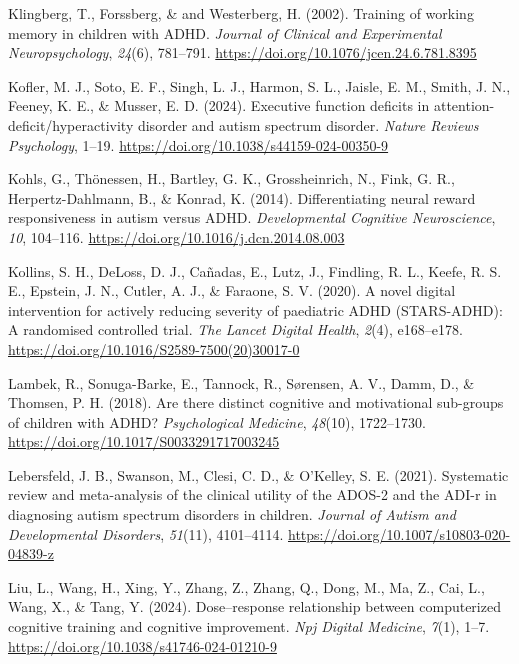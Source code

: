 \documentclass[
  letterpaper,
]{ut-thesis}
\newlength{\cslhangindent}
\newenvironment{CSLReferences}[2] %
 {\begin{list}{}{%
  \setlength{\itemindent}{0pt}
  \setlength{\leftmargin}{0pt}
  \setlength{\parsep}{0pt}
  \ifodd #1
   \setlength{\leftmargin}{\cslhangindent}
   \setlength{\itemindent}{-1\cslhangindent}
  \fi
  \setlength{\itemsep}{#2\baselineskip}}}
 {\end{list}}
\begin{document}
\begin{CSLReferences}{1}{0}
Klingberg, T., Forssberg, \& and Westerberg, H. (2002). Training of
working memory in children with {ADHD}. \emph{Journal of Clinical and
Experimental Neuropsychology}, \emph{24}(6), 781--791.
\url{https://doi.org/10.1076/jcen.24.6.781.8395}

Kofler, M. J., Soto, E. F., Singh, L. J., Harmon, S. L., Jaisle, E. M.,
Smith, J. N., Feeney, K. E., \& Musser, E. D. (2024). Executive function
deficits in attention-deficit/hyperactivity disorder and autism spectrum
disorder. \emph{Nature Reviews Psychology}, 1--19.
\url{https://doi.org/10.1038/s44159-024-00350-9}

Kohls, G., Thönessen, H., Bartley, G. K., Grossheinrich, N., Fink, G.
R., Herpertz-Dahlmann, B., \& Konrad, K. (2014). Differentiating neural
reward responsiveness in autism versus {ADHD}. \emph{Developmental
Cognitive Neuroscience}, \emph{10}, 104--116.
\url{https://doi.org/10.1016/j.dcn.2014.08.003}

Kollins, S. H., DeLoss, D. J., Cañadas, E., Lutz, J., Findling, R. L.,
Keefe, R. S. E., Epstein, J. N., Cutler, A. J., \& Faraone, S. V.
(2020). A novel digital intervention for actively reducing severity of
paediatric {ADHD} ({STARS-ADHD}): A randomised controlled trial.
\emph{The Lancet Digital Health}, \emph{2}(4), e168--e178.
\url{https://doi.org/10.1016/S2589-7500(20)30017-0}

Lambek, R., Sonuga-Barke, E., Tannock, R., Sørensen, A. V., Damm, D., \&
Thomsen, P. H. (2018). Are there distinct cognitive and motivational
sub-groups of children with {ADHD}? \emph{Psychological Medicine},
\emph{48}(10), 1722--1730.
\url{https://doi.org/10.1017/S0033291717003245}

Lebersfeld, J. B., Swanson, M., Clesi, C. D., \& O'Kelley, S. E. (2021).
Systematic review and meta-analysis of the clinical utility of the
{ADOS-2} and the {ADI-r} in diagnosing autism spectrum disorders in
children. \emph{Journal of Autism and Developmental Disorders},
\emph{51}(11), 4101--4114.
\url{https://doi.org/10.1007/s10803-020-04839-z}

Liu, L., Wang, H., Xing, Y., Zhang, Z., Zhang, Q., Dong, M., Ma, Z.,
Cai, L., Wang, X., \& Tang, Y. (2024). Dose--response relationship
between computerized cognitive training and cognitive improvement.
\emph{Npj Digital Medicine}, \emph{7}(1), 1--7.
\url{https://doi.org/10.1038/s41746-024-01210-9}


\end{CSLReferences}
\end{document}
